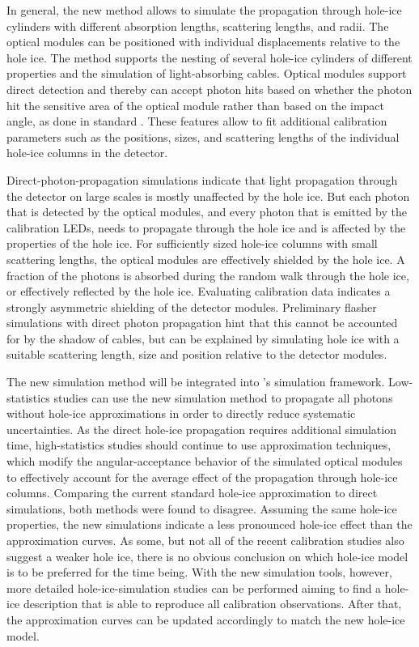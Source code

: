 In general, the new method allows to simulate the propagation through hole-ice cylinders with different absorption lengths, scattering lengths, and radii.
The optical modules can be positioned with individual displacements relative to the hole ice.
The method supports the nesting of several hole-ice cylinders of different properties and the simulation of light-absorbing cables.
Optical modules support direct detection and thereby can accept photon hits based on whether the photon hit the sensitive area of the optical module rather than based on the impact angle, as done in standard \clsim.
These features allow to fit additional calibration parameters such as the positions, sizes, and scattering lengths of the individual hole-ice columns in the \icecube detector.

Direct-photon-propagation simulations indicate that light propagation through the \icecube detector on large scales is mostly unaffected by the hole ice. But each photon that is detected by the optical modules, and every photon that is emitted by the calibration LEDs, needs to propagate through the hole ice and is affected by the properties of the hole ice.
For sufficiently sized hole-ice columns with small scattering lengths, the optical modules are effectively shielded by the hole ice. A fraction of the photons is absorbed during the random walk through the hole ice, or effectively reflected by the hole ice.
Evaluating calibration data indicates a strongly asymmetric shielding of the detector modules. Preliminary flasher simulations with direct photon propagation hint that this cannot be accounted for by the shadow of cables, but can be explained by simulating hole ice with a suitable scattering length, size and position relative to the detector modules.

The new simulation method will be integrated into \icecube's simulation framework.
Low-statistics studies can use the new simulation method to propagate all photons without hole-ice approximations in order to directly reduce systematic uncertainties.
As the direct hole-ice propagation requires additional simulation time, high-statistics studies should continue to use approximation techniques, which modify the angular-acceptance behavior of the simulated optical modules to effectively account for the average effect of the propagation through hole-ice columns.
Comparing the current standard hole-ice approximation to direct simulations, both methods were found to disagree.
Assuming the same hole-ice properties, the new simulations indicate a less pronounced hole-ice effect than the approximation curves.
As some, but not all of the recent calibration studies also suggest a weaker hole ice, there is no obvious conclusion on which hole-ice model is to be preferred for the time being.
With the new simulation tools, however, more detailed hole-ice-simulation studies can be performed aiming to find a hole-ice description that is able to reproduce all calibration observations.
After that, the approximation curves can be updated accordingly to match the new hole-ice model.

